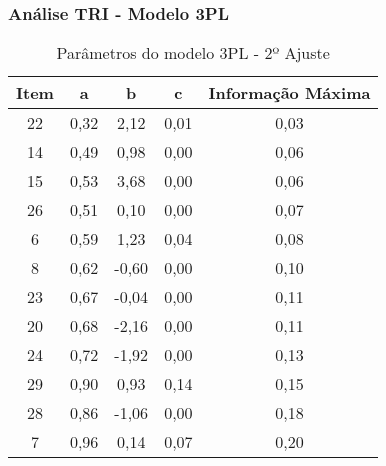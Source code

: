 \documentclass{beamer}
\begin{document}
	
\begin{frame}
	\frametitle{Análise TRI - Modelo 3PL}
	
	\begin{table}[ht]
		\centering
			\caption{Parâmetros do modelo 3PL - 2º Ajuste}
		\scriptsize %
		\begin{tabular}{ccccc}
			\hline
			\textbf{Item} & \textbf{a} & \textbf{b} & \textbf{c} & \textbf{Informação Máxima} \\ 
			\hline 
			22 & 0,32 & 2,12 & 0,01 & 0,03 \\ 
			14 & 0,49 & 0,98 & 0,00 & 0,06 \\ 
			15 & 0,53 & 3,68 & 0,00 & 0,06 \\ 
			26 & 0,51 & 0,10 & 0,00 & 0,07 \\ 
			6  & 0,59 & 1,23 & 0,04 & 0,08 \\ 
			8  & 0,62 & -0,60 & 0,00 & 0,10 \\ 
			23 & 0,67 & -0,04 & 0,00 & 0,11 \\ 
			20 & 0,68 & -2,16 & 0,00 & 0,11 \\ 
			24 & 0,72 & -1,92 & 0,00 & 0,13 \\ 
			29 & 0,90 & 0,93 & 0,14 & 0,15 \\ 
			28 & 0,86 & -1,06 & 0,00 & 0,18 \\ 
			7  & 0,96 & 0,14 & 0,07 & 0,20 \\ 
			\hline
		\end{tabular}%
	\end{table}
	
\end{frame}
\end{document}
